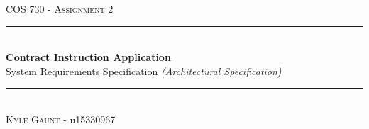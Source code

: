 \documentclass[11pt]{article}
\begin{document}
\begin{titlepage}
	\newcommand{\HRule}{\rule{\linewidth}{0.5mm}}
    \begin{center}

    	\textsc{\LARGE COS 730 - Assignment 2}\\[0.8cm]

    	\HRule\\[0.4cm]

    	{\huge\bfseries Contract Instruction Application}\\[0.2cm]

    	{\huge System Requirements Specification \textit{(Architectural Specification)}}\\[0.2cm]

    	\HRule\\[0.5cm]

	    \textsc{Kyle Gaunt} - u15330967 \\[0cm]

    \end{center}
\end{titlepage}
\tableofcontents
\newpage
\end{document}

